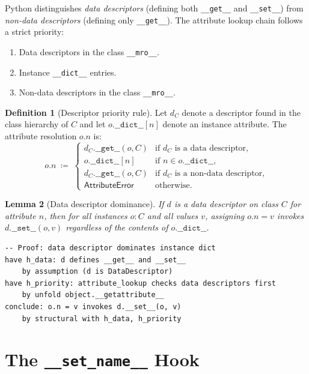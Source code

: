 \documentclass[11pt,a4paper]{report}
\theoremstyle{definition}
\newtheorem{definition}{Definition}[chapter]
\theoremstyle{plain}
\newtheorem{lemma}[definition]{Lemma}
\newcommand{\defeq}{\coloneqq}
\begin{document}
Python distinguishes \emph{data descriptors} (defining both \texttt{\_\_get\_\_}
and \texttt{\_\_set\_\_}) from \emph{non-data descriptors} (defining only
\texttt{\_\_get\_\_}).  The attribute lookup chain follows a strict priority:

\begin{enumerate}
  \item Data descriptors in the class \texttt{\_\_mro\_\_}.
  \item Instance \texttt{\_\_dict\_\_} entries.
  \item Non-data descriptors in the class \texttt{\_\_mro\_\_}.
\end{enumerate}

\begin{definition}[Descriptor priority rule]
Let $d_C$ denote a descriptor found in the class hierarchy of $C$ and let
$o.\texttt{\_\_dict\_\_}[n]$ denote an instance attribute.  The attribute
resolution $o.n$ is:
\[
  o.n \;\defeq\; \begin{cases}
    d_C.\texttt{\_\_get\_\_}(o, C) & \text{if } d_C \text{ is a data descriptor,} \\
    o.\texttt{\_\_dict\_\_}[n]     & \text{if } n \in o.\texttt{\_\_dict\_\_}, \\
    d_C.\texttt{\_\_get\_\_}(o, C) & \text{if } d_C \text{ is a non-data descriptor,} \\
    \mathsf{AttributeError}        & \text{otherwise.}
  \end{cases}
\]
\end{definition}

\begin{lemma}[Data descriptor dominance]
If $d$ is a data descriptor on class $C$ for attribute $n$, then for all
instances $o : C$ and all values $v$, assigning $o.n = v$ invokes
$d.\texttt{\_\_set\_\_}(o, v)$ regardless of the contents of
$o.\texttt{\_\_dict\_\_}$.
\end{lemma}

\begin{lstlisting}[style=proof]
-- Proof: data descriptor dominates instance dict
have h_data: d defines __get__ and __set__
    by assumption (d is DataDescriptor)
have h_priority: attribute_lookup checks data descriptors first
    by unfold object.__getattribute__
conclude: o.n = v invokes d.__set__(o, v)
    by structural with h_data, h_priority
\end{lstlisting}

\section{The \texttt{\_\_set\_name\_\_} Hook}
\end{document}
